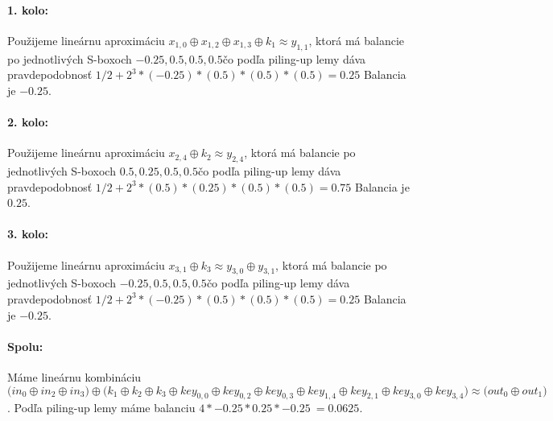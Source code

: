 \paragraph{1. kolo:}
Použijeme lineárnu aproximáciu $
x_{1,0} \oplus x_{1,2} \oplus x_{1,3}  \oplus k_{1} 
 \approx 
y_{1,1} $,
ktorá má balancie po jednotlivých S-boxoch $
-0.25,0.5,0.5,0.5
$čo podľa piling-up lemy dáva pravdepodobnosť 
$1/2 + 2^3*( -0.25)*(0.5)*(0.5)*(0.5 )= 0.25 $
Balancia je $-0.25$.

\paragraph{2. kolo:}
Použijeme lineárnu aproximáciu $
x_{2,4}  \oplus k_{2} 
 \approx 
y_{2,4} $,
ktorá má balancie po jednotlivých S-boxoch $
0.5,0.25,0.5,0.5
$čo podľa piling-up lemy dáva pravdepodobnosť 
$1/2 + 2^3*( 0.5)*(0.25)*(0.5)*(0.5 )= 0.75 $
Balancia je $0.25$.

\paragraph{3. kolo:}
Použijeme lineárnu aproximáciu $
x_{3,1}  \oplus k_{3} 
 \approx 
y_{3,0} \oplus y_{3,1} $,
ktorá má balancie po jednotlivých S-boxoch $
-0.25,0.5,0.5,0.5
$čo podľa piling-up lemy dáva pravdepodobnosť 
$1/2 + 2^3*( -0.25)*(0.5)*(0.5)*(0.5 )= 0.25 $
Balancia je $-0.25$.

\paragraph{Spolu:}  Máme lineárnu kombináciu $ \Big(
in_{0} \oplus in_{2} \oplus in_{3}
\Big) \oplus \Big( k_1 \oplus k_2 \oplus k_3 \oplus 
key_{0,0} \oplus key_{0,2} \oplus key_{0,3} \oplus key_{1,4} \oplus key_{2,1} \oplus key_{3,0} \oplus key_{3,4} \Big) \approx \Big(
out_{0} \oplus out_{1}
\Big) $.
Podľa piling-up lemy máme balanciu $4* -0.25*0.25*-0.25 ~= 0.0625 $.
